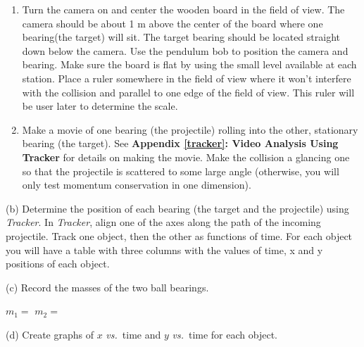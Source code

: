 \begin{enumerate}
\item Turn the camera on and center the wooden board in the field of view. The camera
should be about 1 m above the center of the board where one bearing(the target)
will sit. The target bearing should be located straight down below the camera.
Use the pendulum bob to position the camera and bearing. Make sure the board
is flat by using the small level available at each station. Place a ruler somewhere
in the field of view where it won't interfere with the collision and parallel
to one edge of the field of view. This ruler will be user later to determine
the scale. 
\item Make a movie of one bearing (the projectile) rolling into the other, stationary
bearing (the target). See \textbf{Appendix \ref{tracker}: Video Analysis Using Tracker} 
for details on making the movie. Make the collision a glancing one so that the 
projectile is scattered to some large angle (otherwise, you will only test 
momentum conservation in one dimension).
\end{enumerate}
(b) Determine the position of each bearing (the target and the projectile) 
using \textit{Tracker}. In \textit{Tracker}, align one of the axes along the 
path of the incoming projectile. Track one object, then the other as functions 
of time. For each object you will have a table with three columns with the 
values of time, x and y positions of each object.
\vspace{5mm}


(c) Record the masses of the two ball bearings.
\vspace{5mm}

\( m_{1} =\)  \hfill{}\( m_{2} =\)  \hfill{}
\vspace{5mm}

(d) Create graphs of $x$ \textit{vs.}~time and $y$ \textit{vs.}~time for each object.
\vspace{7mm}

